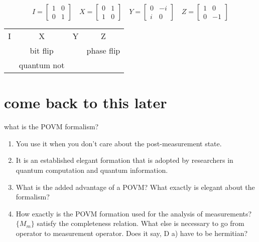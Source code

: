 \documentclass{article}
\begin{document}
\[
I = \begin{bmatrix} 1 & 0 \\ 0 & 1 \end{bmatrix} \quad
X = \begin{bmatrix} 0 & 1 \\ 1 & 0 \end{bmatrix} \quad
Y = \begin{bmatrix} 0 & -i \\ i & 0 \end{bmatrix} \quad
Z = \begin{bmatrix} 1 & 0 \\ 0 & -1 \end{bmatrix}
\]
\begin{center}
  \begin{tabular}{cccc}
I & X & Y & Z \\
  & bit flip    &   & phase flip \\
  & quantum not &   &            \\
\end{tabular}
\end{center}


\section{come back to this later}
what is the POVM formalism? 
\begin{enumerate}
  \item You use it when you don't care about the post-measurement state. 
  \item It is an established elegant formation that is adopted by researchers in quantum computation and quantum information.
  \item What is the added advantage of a POVM? What exactly is elegant about the formalism?
\item How exactly is the POVM formation used for the analysis of measurements? 
$\{M_m\}$ satisfy the completeness relation. What else is necessary to go from operator to measurement operator. Does it say, D a) have to be hermitian? 


\end{enumerate}
\end{document}
